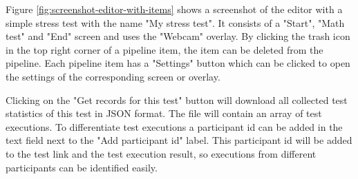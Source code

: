 Figure \ref{fig:screenshot-editor-with-items} shows a screenshot of the editor with a simple stress test with the name "My stress test".
It consists of a "Start", "Math test" and "End" screen and uses the "Webcam" overlay.
By clicking the trash icon in the top right corner of a pipeline item, the item can be deleted from the pipeline.
Each pipeline item has a "Settings" button which can be clicked to open the settings of the corresponding screen or overlay.

Clicking on the "Get records for this test" button will download all collected test statistics of this test in JSON format.
The file will contain an array of test executions.
To differentiate test executions a participant id can be added in the text field next to the "Add participant id" label.
This participant id will be added to the test link and the test execution result, so executions from different participants can be identified easily.
